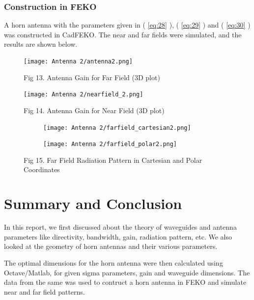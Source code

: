 \documentclass[12pt]{article}
\newcommand*{\myref}[1]{%
  \begingroup
    \hypersetup{
      linkcolor=linkequation,
      linkbordercolor=linkequation,
    }%
    \ref{#1}%
  \endgroup
}
\begin{document}
\subsubsection{Construction in FEKO}
A horn antenna with the parameters given in (\myref{eq:28}), (\myref{eq:29}) and (\myref{eq:30}) was constructed in CadFEKO. The near and far fields were simulated, and the results are shown below. 
\begin{figure}[H]
  \centering
  \texttt{[image: Antenna 2/antenna2.png]}
  \caption{Fig 13. Antenna Gain for Far Field (3D plot)}
\end{figure}
\begin{figure}[H]
  \centering
  \texttt{[image: Antenna 2/nearfield\_2.png]}
  \caption{Fig 14. Antenna Gain for Near Field (3D plot)}
\end{figure}
\begin{figure} [H]
  \begin{subfigure}[b]{0.6\textwidth}
      \centering
      \texttt{[image: Antenna 2/farfield\_cartesian2.png]}
  \end{subfigure}%
  \begin{subfigure}[b]{0.65\textwidth}
      \centering
      \texttt{[image: Antenna 2/farfield\_polar2.png]}
  \end{subfigure}
  \caption{Fig 15. Far Field Radiation Pattern in Cartesian and Polar Coordinates}
\end{figure}

\section{Summary and Conclusion}
In this report, we first discussed about the theory of waveguides and antenna parameters like directivity, bandwidth, gain, radiation pattern, etc. We also looked at the geometry of horn antennas and their various parameters. \linebreak

The optimal dimensions for the horn antenna were then calculated using Octave/Matlab, for given sigma parameters, gain and waveguide dimensions. The data from the same was used to contruct a horn antenna in FEKO and simulate near and far field patterns. \linebreak
\end{document}
